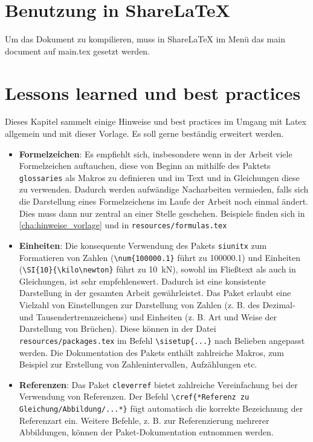 \chapter{Benutzung in ShareLaTeX}
\label{cha:benutzung_sharelatex}

Um das Dokument zu kompilieren, muss in ShareLaTeX im Menü das main document auf \glqq main.tex\grqq{} gesetzt werden. 

\chapter{Lessons learned und best practices}
Dieses Kapitel sammelt einige Hinweise und best practices im Umgang mit Latex allgemein und mit dieser Vorlage. Es soll gerne beständig erweitert werden.

\begin{itemize}
	\item \textbf{Formelzeichen}: Es empfiehlt sich, insbesondere wenn in der Arbeit viele Formelzeichen auftauchen, diese von Beginn an mithilfe des Paktets \verb|glossaries| als Makros zu definieren und im Text und in Gleichungen diese zu verwenden. Dadurch werden aufwändige Nacharbeiten vermieden, falls sich die Darstellung eines Formelzeichens im Laufe der Arbeit noch einmal ändert. Dies muss dann nur zentral an einer Stelle geschehen. Beispiele finden sich in \cref{cha:hinweise_vorlage} und in \verb|resources/formulas.tex|
	\item \textbf{Einheiten}: Die konsequente Verwendung des Pakets \verb|siunitx| zum Formatieren von Zahlen (\verb|\num{100000.1}| führt zu \num{100000.1}) und Einheiten (\verb|\SI{10}{\kilo\newton}| führt zu \SI{10}{\kilo\newton}), sowohl im Fließtext als auch in Gleichungen, ist sehr empfehlenswert. Dadurch ist eine konsistente Darstellung in der gesamten Arbeit gewährleistet. Das Paket erlaubt eine Vielzahl von Einstellungen zur Darstellung von Zahlen (z. B. des Dezimal- und Tausendertrennzeichens) und Einheiten (z. B. Art und Weise der Darstellung von Brüchen). Diese können in der Datei \verb|resources/packages.tex| im Befehl \verb|\sisetup{...}| nach Belieben angepasst werden. Die Dokumentation des Pakets enthält zahlreiche Makros, zum Beispiel zur Erstellung von Zahlenintervallen, Aufzählungen etc.
	\item \textbf{Referenzen}: Das Paket \verb|cleverref| bietet zahlreiche Vereinfachung bei der Verwendung von Referenzen. Der Befehl \verb|\cref{*Referenz zu Gleichung/Abbildung/...*}| fügt automatisch die korrekte Bezeichnung der Referenzart ein. Weitere Befehle, z. B. zur Referenzierung mehrerer Abbildungen, können der Paket-Dokumentation entnommen werden.

\end{itemize}
